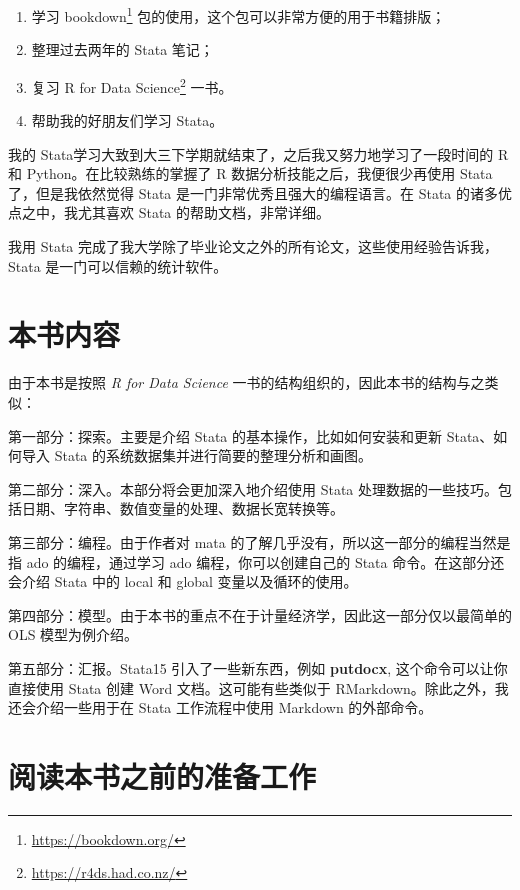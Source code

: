 \documentclass[]{ctexbook}
\providecommand{\tightlist}{%
  \setlength{\itemsep}{0pt}\setlength{\parskip}{0pt}}
\renewcommand{\href}[2]{#2\footnote{\url{#1}}}
\begin{document}
\begin{enumerate}
\def\labelenumi{\arabic{enumi}.}
\tightlist
\item
  学习 \href{https://bookdown.org/}{bookdown} 包的使用，这个包可以非常方便的用于书籍排版；
\item
  整理过去两年的 Stata 笔记；
\item
  复习 \href{https://r4ds.had.co.nz/}{R for Data Science} 一书。
\item
  帮助我的好朋友们学习 Stata。
\end{enumerate}

我的 Stata学习大致到大三下学期就结束了，之后我又努力地学习了一段时间的 R 和 Python。在比较熟练的掌握了 R 数据分析技能之后，我便很少再使用 Stata 了，但是我依然觉得 Stata 是一门非常优秀且强大的编程语言。在 Stata 的诸多优点之中，我尤其喜欢 Stata 的帮助文档，非常详细。

我用 Stata 完成了我大学除了毕业论文之外的所有论文，这些使用经验告诉我，Stata 是一门可以信赖的统计软件。

\hypertarget{section-1}{%
\section{本书内容}\label{section-1}}

由于本书是按照 \emph{R for Data Science} 一书的结构组织的，因此本书的结构与之类似：

第一部分：探索。主要是介绍 Stata 的基本操作，比如如何安装和更新 Stata、如何导入 Stata 的系统数据集并进行简要的整理分析和画图。

第二部分：深入。本部分将会更加深入地介绍使用 Stata 处理数据的一些技巧。包括日期、字符串、数值变量的处理、数据长宽转换等。

第三部分：编程。由于作者对 mata 的了解几乎没有，所以这一部分的编程当然是指 ado 的编程，通过学习 ado 编程，你可以创建自己的 Stata 命令。在这部分还会介绍 Stata 中的 local 和 global 变量以及循环的使用。

第四部分：模型。由于本书的重点不在于计量经济学，因此这一部分仅以最简单的 OLS 模型为例介绍。

第五部分：汇报。Stata15 引入了一些新东西，例如 \textbf{putdocx}, 这个命令可以让你直接使用 Stata 创建 Word 文档。这可能有些类似于 RMarkdown。除此之外，我还会介绍一些用于在 Stata 工作流程中使用 Markdown 的外部命令。

\hypertarget{section-2}{%
\section{阅读本书之前的准备工作}\label{section-2}}
\end{document}
